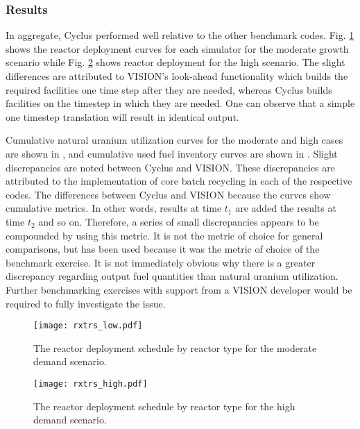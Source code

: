 \subsubsection{Results}


In aggregate, Cyclus performed well relative to the other benchmark
codes. Fig. \ref{fig:rxtrs_low} shows the reactor deployment curves for each
simulator for the moderate growth scenario while Fig. \ref{fig:rxtrs_high} shows
reactor deployment for the high scenario. The slight differences are attributed
to VISION's look-ahead functionality which builds the required facilities one
time step after they are needed, whereas Cyclus builds facilities on the
timestep in which they are needed. One can observe that a simple one timestep
translation will result in identical output.

Cumulative natural uranium utilization curves for the moderate and high cases
are shown in , and cumulative used fuel
inventory curves are shown in
. Slight discrepancies are noted
between Cyclus and VISION. These discrepancies are attributed to the
implementation of core batch recycling in each of the respective codes. The
differences between Cyclus and VISION because the curves show cumulative
metrics. In other words, results at time $t_1$ are added the results at time
$t_2$ and so on. Therefore, a series of small discrepancies appears to be
compounded by using this metric. It is not the metric of choice for general
comparisons, but has been used because it was the metric of choice of the
benchmark exercise. It is not immediately obvious why there is a greater
discrepancy regarding output fuel quantities than natural uranium
utilization. Further benchmarking exercises with support from a VISION developer
would be required to fully investigate the issue.

\begin{figure}
  \begin{center}
    \texttt{[image: rxtrs\_low.pdf]}
    \caption{The reactor deployment schedule by reactor type for the moderate demand scenario.}
    \label{fig:rxtrs_low}
  \end{center}  
\end{figure}

\begin{figure}
  \begin{center}
    \texttt{[image: rxtrs\_high.pdf]}
    \caption{The reactor deployment schedule by reactor type for the high demand scenario.}
    \label{fig:rxtrs_high}
  \end{center}  
\end{figure}


